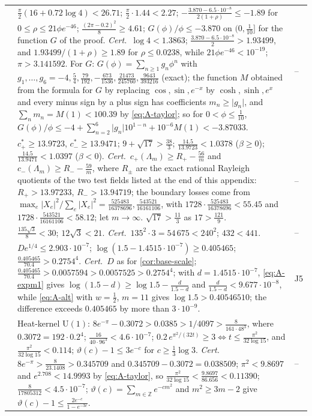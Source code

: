 \documentclass[11pt,a4paper]{amsart}
\theoremstyle{definition}
\theoremstyle{remark}
\numberwithin{equation}{section}
\newcommand{\Z}{\mathbb{Z}}          %
\newcommand{\abs}[1]{\lvert #1\rvert}      %
\newcommand{\U}{\mathrm{U}}                %
\newcommand{\dconst}{\frac{1}{4097}}       %
\newcommand{\dconstinl}{1/4097}            %
\begin{document}
{\begin{longtable}{@{}p{}p{}p{}@{}}
\midrule
{}{thm:no-convexity} & $\frac\pi2(16+0.72\log4)<26.71$; $\frac\pi2\cdot1.44<2.27$; $-\frac{3.870-6.5\cdot10^{-8}}{2(1+\rho)}\le-1.89$ for $0\le\rho\le21\phi e^{-46}$; $\frac{(2\pi-0.2)^2}8\ge4.61$; $G(\phi)/\phi\le-3.870$ on $(0,\frac1{10}]$ for the function $G$ of the proof. \emph{Cert.}\ $\log4<1.3863$; $\frac{3.870-6.5\cdot10^{-8}}2>1.93499$, and $1.93499/(1+\rho)\ge1.89$ for $\rho\le0.0238$, while $21\phi e^{-46}<10^{-19}$; $\pi>3.141592$. For $G$: $G(\phi)=\sum_{n\ge1}g_n\phi^n$ with $g_1,\dots,g_6=-4,\frac54,\frac{79}{192},-\frac{673}{1536},\frac{21473}{245760},\frac{9643}{393216}$ (exact); the function $M$ obtained from the formula for $G$ by replacing $\cos,\sin,e^{-x}$ by $\cosh,\sinh,e^{x}$ and every minus sign by a plus sign has coefficients $m_n\ge\abs{g_n}$, and $\sum_nm_n=M(1)<100.39$ by \eqref{eq:A-taylor}; so for $0<\phi\le\frac1{10}$, $G(\phi)/\phi\le-4+\sum_{n=2}^6\abs{g_n}10^{1-n}+10^{-6}M(1)<-3.87033$. & --\\
{thm:BE-line-field} & $c_+^*\ge13.9723$, $c_-^*\ge13.9471$; $9+\sqrt{17}>\frac{38}3$; $\frac{14.5}{13.9723}<1.0378$ ($\beta\ge0$); $\frac{14.5}{13.9471}<1.0397$ ($\beta<0$). \emph{Cert.}\ $c_+(\Lambda_m)\ge R_+-\frac{56}m$ and $c_-(\Lambda_m)\ge R_--\frac{59}m$, where $R_\pm$ are the exact rational Rayleigh quotients of the two test fields listed at the end of this appendix: $R_+>13.97233$, $R_->13.94719$; the boundary losses come from $\max_e\abs{X_e}^2/\sum_e\abs{X_e}^2=\frac{525483}{16378696},\frac{543521}{16161106}$, with $1728\cdot\frac{525483}{16378696}<55.45$ and $1728\cdot\frac{543521}{16161106}<58.12$; let $m\to\infty$. $\sqrt{17}>\frac{11}3$ as $17>\frac{121}9$. & --\\
{thm:BE-orbit} & $\frac{135\sqrt3}8<30$; $12\sqrt3<21$. \emph{Cert.}\ $135^2\cdot3=54\,675<240^2$; $432<441$. & --\\
{thm:abelian} & $De^{1/4}\le2.903\cdot10^{-7}$; $\log(1.5-1.4515\cdot10^{-7})\ge0.405465$; $\frac{0.405465}{70.4}>0.2754^4$. \emph{Cert.}\ $D$ as for \cref{cor:base-scale}; $\frac{0.405465}{70.4}>0.0057594>0.0057525>0.2754^4$; with $d=1.4515\cdot10^{-7}$, \eqref{eq:A-expm1} gives $\log(1.5-d)\ge\log1.5-\frac d{1.5-d}$ and $\frac d{1.5-d}<9.677\cdot10^{-8}$, while \eqref{eq:A-alt} with $w=\frac12$, $m=11$ gives $\log1.5>0.40546510$; the difference exceeds $0.405465$ by more than $3\cdot10^{-9}$. & J5\\
{thm:abelian} & Heat-kernel $\U(1)$: $8e^{-\pi}-0.3072>0.0385>\dconstinl>\frac8{161\cdot48^3}$, where $0.3072=192\cdot0.2^4$; $\frac{16}{40\cdot96^3}<4.6\cdot10^{-7}$; $0.2\,e^{\pi^2/(32t)}\ge3\iff t\le\frac{\pi^2}{32\log15}$, and $\frac{\pi^2}{32\log15}<0.114$; $\vartheta(c)-1\le3e^{-c}$ for $c\ge\frac13\log3$. \emph{Cert.}\ $8e^{-\pi}>\frac8{23.1408}>0.345709$ and $0.345709-0.3072=0.038509$; $\pi^2<9.8697$ and $e^{2.708}<14.9993$ by \eqref{eq:A-taylor}, so $\frac{\pi^2}{32\log15}<\frac{9.8697}{86.656}<0.11390$; $\frac8{17805312}<4.5\cdot10^{-7}$; $\vartheta(c)=\sum_{m\in\Z}e^{-cm^2}$ and $m^2\ge3m-2$ give $\vartheta(c)-1\le\frac{2e^{-c}}{1-e^{-3c}}$. & --\\

\end{longtable}}
\end{document}
